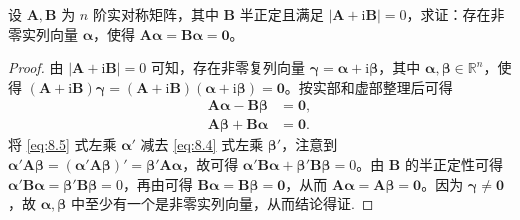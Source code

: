 \documentclass[../../main.tex]{subfiles}%
\begin{document}
\begin{proposition}\label{proposition:命题8.5735161}
设 $\boldsymbol{A},\boldsymbol{B}$ 为 $n$ 阶实对称矩阵，其中 $\boldsymbol{B}$ 半正定且满足 $|\boldsymbol{A}+\mathrm{i}\boldsymbol{B}| = 0$，求证：存在非零实列向量 $\boldsymbol{\alpha}$，使得 $\boldsymbol{A}\boldsymbol{\alpha}=\boldsymbol{B}\boldsymbol{\alpha}=\boldsymbol{0}$。
\end{proposition}
\begin{proof}

由 $|\boldsymbol{A}+\mathrm{i}\boldsymbol{B}| = 0$ 可知，存在非零复列向量 $\boldsymbol{\gamma}=\boldsymbol{\alpha}+\mathrm{i}\boldsymbol{\beta}$，其中 $\boldsymbol{\alpha},\boldsymbol{\beta}\in\mathbb{R}^n$，使得 $(\boldsymbol{A}+\mathrm{i}\boldsymbol{B})\boldsymbol{\gamma}=(\boldsymbol{A}+\mathrm{i}\boldsymbol{B})(\boldsymbol{\alpha}+\mathrm{i}\boldsymbol{\beta})=\boldsymbol{0}$。按实部和虚部整理后可得
\begin{align}
\boldsymbol{A}\boldsymbol{\alpha}-\boldsymbol{B}\boldsymbol{\beta}&=\boldsymbol{0}, \label{eq:8.4}\\
\boldsymbol{A}\boldsymbol{\beta}+\boldsymbol{B}\boldsymbol{\alpha}&=\boldsymbol{0}. \label{eq:8.5}
\end{align}
将 \eqref{eq:8.5} 式左乘 $\boldsymbol{\alpha}'$ 减去 \eqref{eq:8.4} 式左乘 $\boldsymbol{\beta}'$，注意到 $\boldsymbol{\alpha}'\boldsymbol{A}\boldsymbol{\beta}=(\boldsymbol{\alpha}'\boldsymbol{A}\boldsymbol{\beta})'=\boldsymbol{\beta}'\boldsymbol{A}\boldsymbol{\alpha}$，故可得 $\boldsymbol{\alpha}'\boldsymbol{B}\boldsymbol{\alpha}+\boldsymbol{\beta}'\boldsymbol{B}\boldsymbol{\beta}=0$。由 $\boldsymbol{B}$ 的半正定性可得 $\boldsymbol{\alpha}'\boldsymbol{B}\boldsymbol{\alpha}=\boldsymbol{\beta}'\boldsymbol{B}\boldsymbol{\beta}=0$，再由可得 $\boldsymbol{B}\boldsymbol{\alpha}=\boldsymbol{B}\boldsymbol{\beta}=\boldsymbol{0}$，从而 $\boldsymbol{A}\boldsymbol{\alpha}=\boldsymbol{A}\boldsymbol{\beta}=\boldsymbol{0}$。因为 $\boldsymbol{\gamma}\neq\boldsymbol{0}$，故 $\boldsymbol{\alpha},\boldsymbol{\beta}$ 中至少有一个是非零实列向量，从而结论得证.

\end{proof}
\end{document}
